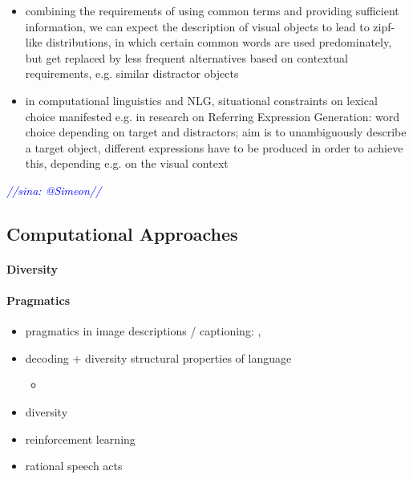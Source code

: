 \documentclass[11pt,a4paper]{article}
\newcommand{\sina}[1]{\textcolor{blue}{\emph{//sina: #1//}}}
\begin{document}
\begin{itemize}
    \item combining the requirements of using common terms and providing sufficient information, we can expect the description of visual objects to lead to zipf-like distributions, in which certain common words are used predominately, but get replaced by less frequent alternatives based on contextual requirements, e.g. similar distractor objects
    \item in computational linguistics and NLG, situational constraints on lexical choice manifested e.g. in research on Referring Expression Generation: word choice depending on target and distractors; aim is to unambiguously describe a target object, different expressions have to be produced in order to achieve this, depending e.g. on the visual context
\end{itemize}





\sina{@Simeon}

\subsection{Computational Approaches}

\paragraph{Diversity}

\paragraph{Pragmatics }

\begin{itemize}
	\item pragmatics in image descriptions / captioning: \citet{Miltenburg2016}, \citet{Cohn-Gordon2018}
	\item decoding + diversity
	\citep{ippolito-etal-2019-comparison} \citep{Wang2019} \citep{van-miltenburg-etal-2018-measuring} structural properties of language \citep{ghodsi-denero-2016-analysis} \citep{Lippi2018}
	\begin{itemize}
		\item \citep{zarriess-schlangen-2018-decoding}
	\end{itemize}
	\item diversity
	\item reinforcement learning
	\item rational speech acts

\end{itemize}
\end{document}
